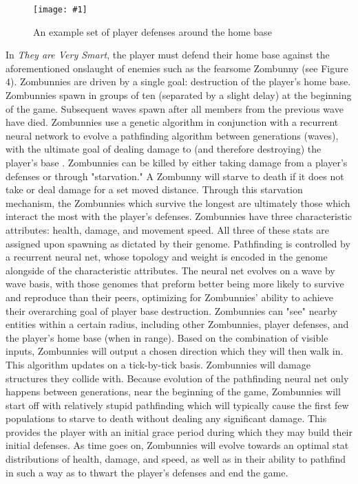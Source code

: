 \documentclass[letterpaper]{article}
\def\imfig#1#2{\begin{figure}[h] \centering \texttt{[image: \#1]} \caption{#2} \end{figure}}
\def\tavs{\textit{They are Very Smart}}
\begin{document}
\imfig{BaseExample}{An example set of player defenses around the home base}
In \tavs, the player must defend their home base against the aforementioned
onslaught of enemies such as the fearsome Zombunny (see Figure 4). Zombunnies
are driven by a single goal: destruction of the player's home base. Zombunnies
spawn in groups of ten (separated by a slight delay) at the beginning of the
game. Subsequent waves spawn after all members from the previous wave have died.
Zombunnies use a genetic algorithm in conjunction with a recurrent neural
network to evolve a pathfinding algorithm between generations (waves), with the
ultimate goal of dealing damage to (and therefore destroying) the player's base
. Zombunnies can be killed by either taking damage from a player's defenses or
through "starvation." A Zombunny will starve to death if it does not take or
deal damage for a set moved distance. Through this starvation mechanism, the
Zombunnies which survive the longest are ultimately those which interact the
most with the player's defenses. Zombunnies have three
characteristic attributes: health, damage, and movement speed. All three of
these stats are assigned upon spawning as dictated by their genome. Pathfinding
is controlled by a recurrent neural net, whose topology and weight is encoded in
the genome alongside of the characteristic attributes. The neural net evolves on
a wave by wave basis, with those genomes that preform better being more likely
to survive and reproduce than their peers, optimizing for Zombunnies' ability to
achieve their overarching goal of player base destruction. Zombunnies can "see"
nearby entities within a certain radius, including other Zombunnies, player
defenses, and the player's home base (when in range). Based on the combination
of visible inputs, Zombunnies will output a chosen direction which they will
then walk in. This algorithm updates on a tick-by-tick basis. Zombunnies will
damage structures they collide with. Because evolution of the pathfinding neural
net only happens between generations, near the beginning of the game, Zombunnies
will start off with relatively stupid pathfinding which will typically cause the
first few populations to starve to death without dealing any significant damage.
This provides the player with an initial grace period during which they may
build their initial defenses. As time goes on, Zombunnies will evolve towards an
optimal stat distributions of health, damage, and speed, as well as in their
ability to pathfind in such a way as to thwart the player's defenses and end the
game.
\end{document}

